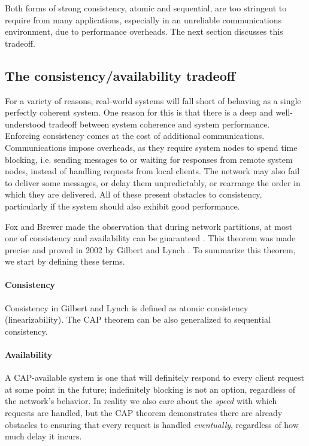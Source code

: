 Both forms of strong consistency, atomic and sequential, are too
stringent to require from many applications, especially in an
unreliable communications environment, due to performance overheads.
The next section discusses this tradeoff.

\subsection{The consistency/availability tradeoff}

For a variety of reasons, real-world systems will fall short of
behaving as a single perfectly coherent system. One reason for this is
that there is a deep and well-understood tradeoff between system
coherence and system performance. Enforcing consistency comes at the
cost of additional communications. Communications impose overheads, as
they require system nodes to spend time blocking, i.e. sending
messages to or waiting for responses from remote system nodes, instead
of handling requests from local clients. The network may also fail to
deliver some messages, or delay them unpredictably, or rearrange the
order in which they are delivered. All of these present obstacles to
consistency, particularly if the system should also exhibit good
performance.

Fox and Brewer made the observation that during network partitions, at
most one of consistency and availability can be guaranteed
\cite{}. This theorem was made precise and proved in 2002 by Gilbert
and Lynch \cite{}. To summarize this theorem, we start by defining
these terms.

\paragraph{Consistency}

Consistency in Gilbert and Lynch is defined as atomic consistency
(linearizability). The CAP theorem can be also generalized to
sequential consistency.

\paragraph{Availability}

A CAP-available system is one that will definitely respond to every
client request at some point in the future; indefinitely blocking is
not an option, regardless of the network's behavior. In reality we
also care about the \emph{speed} with which requests are handled, but
the CAP theorem demonstrates there are already obstacles to ensuring
that every request is handled \emph{eventually}, regardless of how
much delay it incurs.

